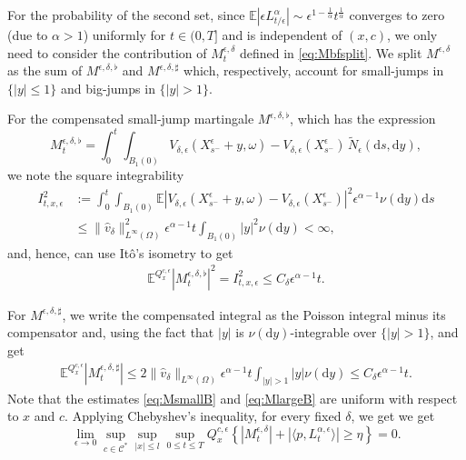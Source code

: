 \documentclass[11pt,reqno]{amsart}
\theoremstyle{definition}
\theoremstyle{remark}
\numberwithin{equation}{section}
\newcommand{\eps}{\epsilon}
\newcommand{\dd}{\mathrm{d}}
\begin{document}
For the probability of the second set, since $\mathbb{E}|\eps L^\alpha_{t/\eps}| \sim \eps^{1-\frac{1}{\alpha}}t^{\frac1\alpha}$ converges to zero (due to $\alpha >1$) uniformly for $t\in (0,T]$ and is independent of $(x,c)$, we only need to consider the contribution of $M^{\eps,\delta}_t$ defined in \eqref{eq:Mbfsplit}. We split $M^{\epsilon,\delta}$ as the sum of $M^{\epsilon,\delta,\flat}$ and $M^{\epsilon,\delta,\sharp}$ which, respectively, account for small-jumps in $\{|y|\leq1\}$ and big-jumps in $\{|y|>1\}$.

For the compensated small-jump martingale $M^{\eps,\delta,\flat}$, which has the expression
\begin{equation*}
    M^{\eps,\delta,\flat}_t = \int_0^t \int_{B_1(0)} V_{\delta,\eps}(X^\eps_{s^-}+y,\omega) - V_{\delta,\eps}(X^\eps_{s^-})\,\widetilde{N}_\eps(\dd s,\dd y),
\end{equation*}
we note the square integrability
\begin{equation*}
\begin{aligned}
    I^2_{t,x,\eps} &:= \int_0^t\int_{B_1(0)} \mathbb{E}|V_{\delta,\eps}(X^\eps_{s^-}+y,\omega) - V_{\delta,\eps}(X^\eps_{s^-})|^2 \eps^{\alpha-1}\nu(\dd y)\dd s \\
    &\le \|\hat{v}_\delta\|_{L^\infty(\Omega)}^2 \eps^{\alpha-1} t \int_{B_1(0)} |y|^2\nu(\dd y) < \infty,
    \end{aligned}
\end{equation*}
and, hence, can use It\^{o}'s isometry to get
\begin{align}\label{eq:MsmallB}
 \mathbb E^{Q_x^{c,\epsilon}}
 |M_t^{\epsilon,\delta,\flat}|^2 = I^2_{t,x,\eps} \le C_\delta \epsilon^{\alpha-1}t.
\end{align}

For $M^{\eps,\delta,\sharp}$, we write the
compensated integral as the Poisson integral minus its compensator and, using the fact that $|y|$ is $\nu(\dd y)$-integrable over $\{|y|>1\}$, and get 
\begin{equation}
\label{eq:MlargeB}
\begin{aligned}
 \mathbb E^{Q_x^{c,\epsilon}}
 |M_t^{\epsilon,\delta,\sharp}|
 \leq  2 \|\widehat v_\delta\|_{L^\infty(\Omega)} \epsilon^{\alpha-1} t
 \int_{|y|>1}|y|\nu(\mathrm dy)
 \leq C_{\delta}\epsilon^{\alpha-1}t.
\end{aligned}
\end{equation}
Note that the estimates \eqref{eq:MsmallB} and
\eqref{eq:MlargeB} are uniform with respect to $x$ and $c$. Applying Chebyshev's inequality, for every fixed $\delta$, we get
we get
\begin{equation}\label{LE3}
    \lim_{\epsilon\to 0}\sup_{c\in\mathscr{C}^{\ast}} \sup_{|x| \leq l} \sup_{0 \leq t \leq T} Q^{c, \epsilon}_{x}\left\{|M_t^{\epsilon,\delta}|+
    |\langle p,L_t^{\alpha,\epsilon}\rangle| \geq \eta \right\} = 0.
\end{equation}
\end{document}
